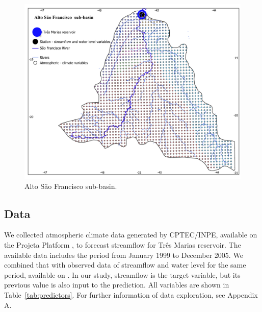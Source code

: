 \documentclass[12pt]{article}
\begin{document}
\begin{figure}[htbp]
  \centering
  \includegraphics[width=0.9\linewidth]{Figures/mapa.pdf}
  \caption{Alto São Francisco sub-basin.}
  \label{fig:studyarea}
\end{figure}

\subsection{Data}
\label{ssec:Data}

We collected atmospheric climate data generated by CPTEC/INPE, available on the Projeta Platform \cite{chou2014assessment,chou2014evaluation,Lyra2018}, to forecast streamflow for Três Marias reservoir. The available data includes the period from January 1999 to December 2005. We combined that with observed data of streamflow and water level for the same period, available on \cite{onsnivel,onsvazao}. In our study, streamflow is the target variable, but its previous value is also input to the prediction. All variables are shown in Table~\ref{tab:predictors}. For further information of data exploration, see Appendix A.
\end{document}
